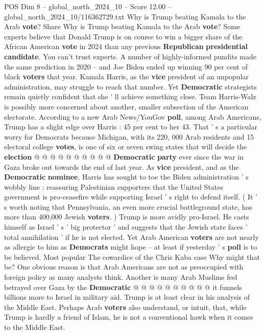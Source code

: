 \begin{textsample}{POS Dim 8 – global\_north\_2024\_10 – Score 12.00 – global\_north\_2024\_10/116362729.txt}  \label{ex:f8_pos_163}
Why is Trump beating Kamala to the Arab \textbf{vote}?
Share Why is Trump beating Kamala to the Arab \textbf{vote}?
Some experts believe that Donald Trump is on course to win a bigger share of the African American \textbf{vote} in 2024 than any previous \textbf{Republican} \textbf{presidential} \textbf{candidate}.
You can't trust experts.
A number of highly-informed pundits made the same prediction in 2020 -- and Joe Biden ended up winning 90 per cent of black \textbf{voters} that year.
Kamala Harris, as the \textbf{vice} president of an unpopular administration, may struggle to reach that number.
Yet \textbf{Democratic} strategists remain quietly confident that she ' ll achieve something close.
Team Harris-Walz is possibly more concerned about another, smaller subsection of the American electorate.
According to a new Arab News/YouGov \textbf{poll}, among Arab Americans, Trump has a slight edge over Harris : 45 per cent to her 43.
That ' s a particular worry for Democrats because Michigan, with its 220, 000 Arab residents and 15 electoral college \textbf{votes}, is one of six or seven swing states that will decide the \textbf{election} @ @ @ @ @ @ @ @ @ @ \textbf{Democratic} \textbf{party} ever since the war in Gaza broke out towards the end of last year.
As \textbf{vice} president, and as the \textbf{Democratic} \textbf{nominee}, Harris has sought to toe the Biden administration ' s wobbly line : reassuring Palestinian supporters that the United States government is pro-ceasefire while supporting Israel ' s right to defend itself. ( It ' s worth noting that Pennsylvania, an even more crucial battleground state, has more than 400,000 Jewish \textbf{voters}. ) Trump is more avidly pro-Israel.
He casts himself as Israel ' s ' big protector ' and suggests that the Jewish state faces ' total annihilation ' if he is not elected.
Yet Arab American \textbf{voters} are not nearly as allergic to him as \textbf{Democrats} might hope -- at least if yesterday ' s \textbf{poll} is to be believed.
Most popular The cowardice of the Chris Kaba case Why might that be?
One obvious reason is that Arab Americans are not as preoccupied with foreign policy as many analysts think.
Another is many Arab Muslims feel betrayed over Gaza by the \textbf{Democratic} @ @ @ @ @ @ @ @ @ @ it funnels billions more to Israel in military aid.
Trump is at least clear in his analysis of the Middle East.
Perhaps Arab \textbf{voters} also understand, or intuit, that, while Trump is hardly a friend of Islam, he is not a conventional hawk when it comes to the Middle East.

\end{textsample}

